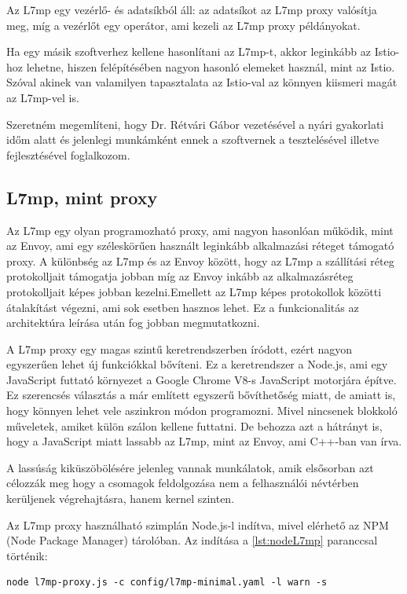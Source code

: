 Az L7mp egy vezérlő- és adatsíkból áll: az adatsíkot az L7mp proxy valósítja meg, míg a 
vezérlőt egy operátor, ami kezeli az L7mp proxy példányokat.

Ha egy másik szoftverhez kellene hasonlítani az L7mp-t, akkor leginkább az Istio-hoz 
lehetne, hiszen felépítésében nagyon hasonló elemeket használ, mint az Istio. Szóval 
akinek van valamilyen tapasztalata az Istio-val az könnyen kiismeri magát az L7mp-vel is.

Szeretném megemlíteni, hogy Dr. Rétvári Gábor vezetésével a nyári gyakorlati időm alatt 
és jelenlegi munkámként ennek a szoftvernek a tesztelésével  illetve fejlesztésével 
foglalkozom. 

\subsection{L7mp, mint proxy}

Az L7mp egy olyan programozható proxy, ami nagyon hasonlóan működik, mint az Envoy, ami 
egy széleskörűen használt leginkább alkalmazási réteget támogató proxy. A különbség
az L7mp és az Envoy között, hogy az L7mp a szállítási réteg protokolljait 
támogatja jobban míg az Envoy inkább az alkalmazásréteg protokolljait képes jobban 
kezelni.Emellett az L7mp képes protokollok közötti átalakítást végezni, ami sok esetben 
hasznos lehet. Ez a funkcionalitás az architektúra leírása után fog jobban 
megmutatkozni.

A L7mp proxy egy magas szintű keretrendszerben íródott, ezért nagyon egyszerűen 
lehet új funkciókkal bővíteni. Ez a keretrendszer a Node.js, ami egy JavaScript
futtató környezet a Google Chrome V8-s JavaScript motorjára építve. Ez szerencsés 
választás a már említett egyszerű bővíthetőség miatt, de amiatt is, hogy
könnyen lehet vele aszinkron módon programozni. Mivel nincsenek blokkoló műveletek,
amiket külön szálon kellene futtatni. De behozza azt a hátrányt is, hogy a 
JavaScript miatt lassabb az L7mp, mint az Envoy, ami C++-ban van írva. 

A lassúság kiküszöbölésére jelenleg vannak munkálatok, amik elsősorban azt 
célozzák meg hogy a csomagok feldolgozása nem a felhasználói névtérben kerüljenek
végrehajtásra, hanem kernel szinten. 

Az L7mp proxy használható szimplán Node.js-l indítva, mivel elérhető az NPM (Node 
Package Manager) tárolóban. Az indítása a \ref{lst:nodeL7mp} paranccsal történik: 

\begin{lstlisting}[caption=L7mp indítása Node.js segítségével, label=lst:nodeL7mp]
node l7mp-proxy.js -c config/l7mp-minimal.yaml -l warn -s
\end{lstlisting}

